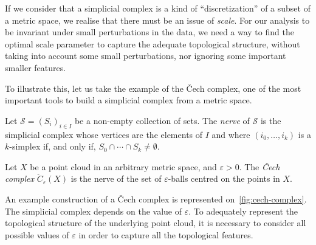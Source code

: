 \documentclass[a4paper,11pt,openany,extrafontsizes]{memoir}
\begin{document}
If we consider that a simplicial complex is a kind of
``discretization'' of a subset of a metric space, we realise that
there must be an issue of \emph{scale}. For our analysis to be
invariant under small perturbations in the data, we need a way to find
the optimal scale parameter to capture the adequate topological
structure, without taking into account some small perturbations, nor
ignoring some important smaller features.

To illustrate this, let us take the example of the Čech complex, one
of the most important tools to build a simplicial complex from a
metric space.

\begin{defn}[Nerve]
  Let $\mathcal{S} = {(S_i)}_{i\in I}$ be a non-empty collection of
  sets. The \emph{nerve} of $\mathcal{S}$ is the simplicial complex
  whose vertices are the elements of $I$ and where
  $(i_0, \ldots, i_k)$ is a $k$-simplex if, and only if,
  $S_0 \cap \cdots \cap S_k \neq \emptyset$.
\end{defn}

\begin{defn}
  Let $X$ be a point cloud in an arbitrary metric space, and
  $\varepsilon > 0$. The \emph{Čech complex}
  $\check{C}_\varepsilon(X)$ is the nerve of the set of
  $\varepsilon$-balls centred on the points in $X$.
\end{defn}


An example construction of a Čech complex is represented
on~\autoref{fig:cech-complex}. The simplicial complex depends on the
value of $\varepsilon$. To adequately represent the topological
structure of the underlying point cloud, it is necessary to consider
all possible values of $\varepsilon$ in order to capture all the
topological features.
\end{document}

